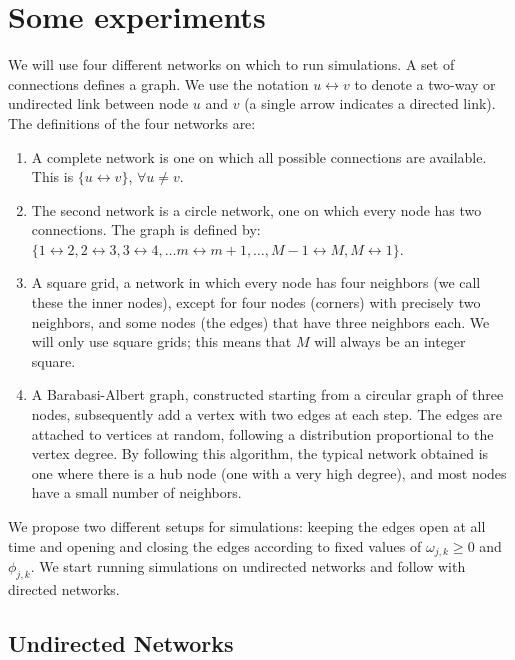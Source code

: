 \documentclass[12pt]{article}
\begin{document}
\section{Some experiments}

We will use four different networks on which to run simulations.
A set of connections defines a graph.
We use the notation $u \leftrightarrow v$ to denote a two-way or undirected link between node $u$ and $v$ (a single arrow indicates a directed link).
The definitions of the four networks are:
\begin{enumerate}
  \item A complete network is one on which all possible connections are available.
    This is $\{u \leftrightarrow v\}$, $\forall u \neq v$.
  \item The second network is a circle network, one on which every node has two connections.
    The graph is defined by: $\{1  \leftrightarrow 2, 2 \leftrightarrow 3, 3 \leftrightarrow 4, \dots m \leftrightarrow m+1, \ldots, M-1 \leftrightarrow M, M \leftrightarrow 1\}$.
  \item A square grid, a network in which every node has four neighbors (we call these the inner nodes), except for four nodes (corners) with precisely two neighbors, and some nodes (the edges) that have three neighbors each.
    We will only use square grids; this means that $M$ will always be an integer square.
  \item A Barabasi-Albert graph, constructed starting from a circular graph of three nodes, subsequently add a vertex with two edges at each step. The edges are attached to vertices at random, following a distribution proportional to the vertex degree.
    By following this algorithm, the typical network obtained is one where there is a hub node (one with a very high degree), and most nodes have a small number of neighbors.
\end{enumerate}

We propose two different setups for simulations: keeping the edges open at all time and opening and closing the edges according to fixed values of $\omega_{j,k} \ge 0$ and $\phi_{j,k}$.
We start running simulations on undirected networks and follow with directed networks.

\subsection{Undirected Networks}
\label{sec:undirected}
\end{document}

